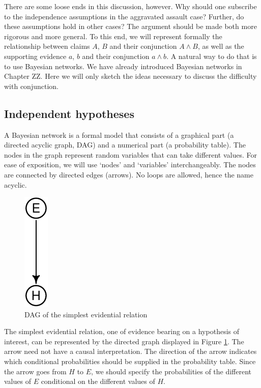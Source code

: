 \documentclass[
  10pt,
  dvipsnames,enabledeprecatedfontcommands]{scrartcl}
\begin{document}
There are some loose ends in this discussion, however. Why should one
subscribe to the independence assumptions in the aggravated assault
case? Further, do these assumptions hold in other cases? The argument
should be made both more rigorous and more general. To this end, we will
represent formally the relationship between claims \(A\), \(B\) and
their conjunction \(A\wedge B\), as well as the supporting evidence
\(a\), \(b\) and their conjunction \(a\wedge b\). A natural way to do
that is to use Bayesian networks. We have already introduced Bayesian
networks in Chapter ZZ.  Here we will only
sketch the ideas necessary to discuss the difficulty with conjunction.

\hypertarget{independent-hypotheses}{%
\subsection{Independent hypotheses}\label{independent-hypotheses}}

A Bayesian network is a formal model that consists of a graphical part
(a directed acyclic graph, \textsf{DAG}) and a numerical part (a
probability table). The nodes in the graph represent random variables
that can take different values. For ease of exposition, we will use
`nodes' and `variables' interchangeably. The nodes are connected by
directed edges (arrows). No loops are allowed, hence the name acyclic.

\begin{figure}

\begin{center}\includegraphics{conjunction-paradox4_files/figure-latex/fig:hEDAG-1} \end{center}
\caption{DAG of the simplest evidential relation}
\label{fig:hEDAG}
\end{figure}

The simplest evidential relation, one of evidence bearing on a
hypothesis of interest, can be represented by the directed graph
displayed in Figure \ref{fig:hEDAG}. The arrow need not have a causal
interpretation. The direction of the arrow indicates which conditional
probabilities should be supplied in the probability table. Since the
arrow goes from \(H\) to \(E\), we should specify the probabilities of
the different values of \(E\) conditional on the different values of
\(H\).
\end{document}
